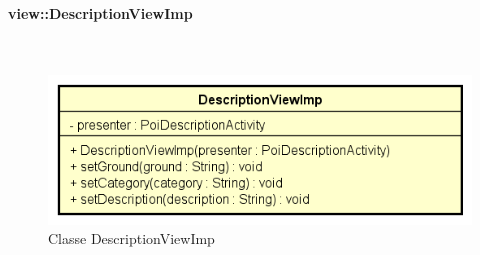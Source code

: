 \documentclass[../DefinizioneDiProdotto.tex]{subfiles}
\begin{document}
\paragraph{view::DescriptionViewImp}
\
\begin{figure}[H]
	\centering
	\includegraphics[width=\maxwidth]{img/DescriptionViewImp.png}
	\caption{Classe DescriptionViewImp}\label{fig:view::DescriptionViewImp} 
\end{figure}
\end{document}
